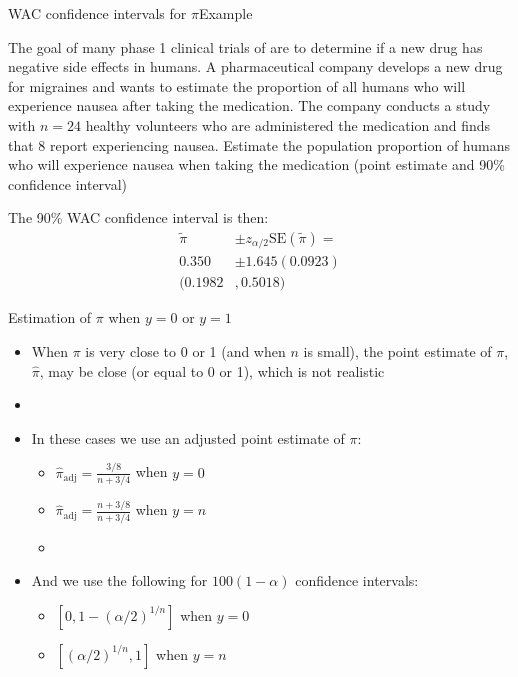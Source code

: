 \documentclass[xcolor=dvipsnames]{beamer}
\begin{document}
\begin{frame}{WAC confidence intervals for $\pi$}{Example}
	\begin{itemize} {\tiny
			\item The goal of many phase 1 clinical trials of are to determine if a new drug has negative side effects in humans. A pharmaceutical company develops a new drug for migraines and wants to estimate the proportion of all humans who will experience nausea after taking the medication. The company conducts a study with $n = 24$ healthy volunteers who are administered the medication and finds that 8 report experiencing nausea. Estimate the population proportion of humans who will experience nausea when taking the medication (point estimate and 90\% confidence interval) }
		\item[]
		\item The 90\% WAC confidence interval is then: 
		\begin{align*}
			\tilde{\pi} &\pm z_{\alpha/2} \text{SE}(\tilde{\pi}) =\\
			  0.350 &\pm 1.645(0.0923) \\
			  (0.1982&, 0.5018)
		\end{align*}
	\end{itemize}
\end{frame}

\begin{frame}{Estimation of $\pi$ when $y = 0$ or $y = 1$}
	\begin{itemize}
		\item When $\pi$ is very close to 0 or 1 (and when $n$ is small), the point estimate of $\pi$, $\hat{\pi}$, may be close (or equal to 0 or 1), which is not realistic
		\item[]
		\item In these cases we use an adjusted point estimate of $\pi$:
		\begin{itemize}
			\item $\hat{\pi}_{\text{adj}}= \frac{3/8}{n + 3/4}$ when $y = 0$
			\item $\hat{\pi}_{\text{adj}}= \frac{n + 3/8}{n + 3/4}$ when $y = n$
			\item[]
		\end{itemize}
		
		\item And we use the following for $100(1-\alpha)$ confidence intervals:
		\begin{itemize}
			\item $\left[0, 1 - (\alpha / 2)^{1/n}\right]$ when $y = 0$
			\item $\left[(\alpha / 2)^{1/n}, 1\right]$ when $y = n$
		\end{itemize}
	\end{itemize}
\end{frame}
\end{document}
